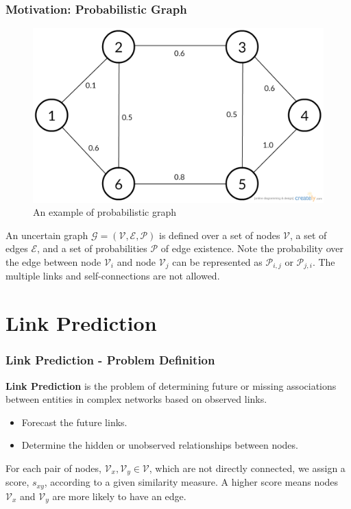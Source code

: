 \documentclass[9pt]{beamer}
\begin{document}
\begin{frame}
\frametitle{Motivation: Probabilistic Graph}
\begin{figure}[H]
\centering
\includegraphics[scale = 0.2]{probabilistic_graph.png}
\caption{An example of probabilistic graph}
\end{figure}
\vspace{-0.28in}
An uncertain graph $\mathcal{G = (V,E,P)}$ is defined over a set of nodes $\mathcal{V}$, a set of edges $\mathcal{E}$, and a set of probabilities $\mathcal{P}$ of edge existence. Note the probability over the edge between node $\mathcal{V}_i$ and node $\mathcal{V}_j$ can be represented as $\mathcal{P}_{i,j}$ or $\mathcal{P}_{j,i}$. The multiple links and self-connections are not allowed.
\end{frame}


\section{Link Prediction}

\begin{frame}
\frametitle{Link Prediction - Problem Definition}

\textbf{Link Prediction} is the problem of determining future or missing associations between entities in complex networks based on observed links.
\begin{itemize}
\item Forecast the future links.
\item Determine the hidden or unobserved relationships between nodes.
\end{itemize}

For each pair of nodes, $\mathcal{V}_x,\mathcal{V}_y\in \mathcal{V}$, which are not directly connected, we assign a score, $s_{xy}$, according to a given similarity measure. A higher score means nodes $\mathcal{V}_x$ and $\mathcal{V}_y$ are more likely to have an edge. 
\end{frame}
\end{document}
